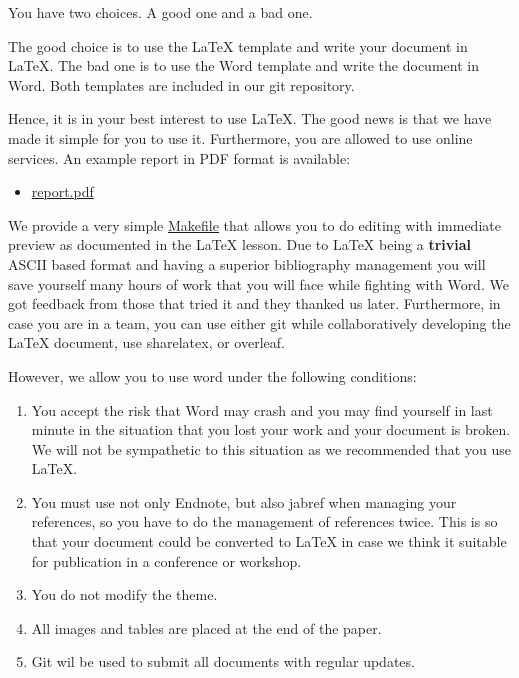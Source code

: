 You have two choices. A good one and a bad one.

The good choice is to use the LaTeX template and write your document in
LaTeX. The bad one is to use the Word template and write the document in
Word. Both templates are included in our git repository.

Hence, it is in your best interest to use LaTeX. The good news is that
we have made it simple for you to use it. Furthermore, you are allowed
to use online services. An example report in PDF format is available:

\begin{itemize}

\item
  \href{https://github.com/cloudmesh/classes/blob/master/docs/source/format/report/latex/report.pdf}{report.pdf}
\end{itemize}

We provide a very simple
\href{https://github.com/cloudmesh/classes/blob/master/docs/source/format/report/latex/Makefile}{Makefile}
that allows you to do editing with immediate preview as documented in
the LaTeX lesson. Due to LaTeX being a \textbf{trivial} ASCII based
format and having a superior bibliography management you will save
yourself many hours of work that you will face while fighting with Word.
We got feedback from those that tried it and they thanked us later.
Furthermore, in case you are in a team, you can use either git while
collaboratively developing the LaTeX document, use sharelatex, or
overleaf.

However, we allow you to use word under the following conditions:

\begin{enumerate}
\def\labelenumi{\arabic{enumi}.}

\item
  You accept the risk that Word may crash and you may find yourself in
  last minute in the situation that you lost your work and your document
  is broken. We will not be sympathetic to this situation as we
  recommended that you use LaTeX.
\item
  You must use not only Endnote, but also jabref when managing your
  references, so you have to do the management of references twice. This
  is so that your document could be converted to LaTeX in case we think
  it suitable for publication in a conference or workshop.
\item
  You do not modify the theme.
\item
  All images and tables are placed at the end of the paper.
\item
  Git wil be used to submit all documents with regular updates.
\end{enumerate}

